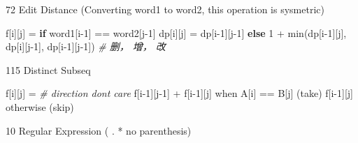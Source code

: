 \documentclass[
]{article}
\newenvironment{Shaded}{}{}
\newcommand{\BuiltInTok}[1]{#1}
\newcommand{\CommentTok}[1]{\textcolor[rgb]{0.38,0.63,0.69}{\textit{#1}}}
\newcommand{\ControlFlowTok}[1]{\textcolor[rgb]{0.00,0.44,0.13}{\textbf{#1}}}
\newcommand{\DecValTok}[1]{\textcolor[rgb]{0.25,0.63,0.44}{#1}}
\newcommand{\NormalTok}[1]{#1}
\newcommand{\OperatorTok}[1]{\textcolor[rgb]{0.40,0.40,0.40}{#1}}
\begin{document}
72 Edit Distance (Converting word1 to word2, this operation is
sysmetric)

\begin{Shaded}
\begin{Highlighting}[]
\NormalTok{f[i][j] }\OperatorTok{=} \ControlFlowTok{if}\NormalTok{ word1[i}\OperatorTok{{-}}\DecValTok{1}\NormalTok{] }\OperatorTok{==}\NormalTok{ word2[j}\OperatorTok{{-}}\DecValTok{1}\NormalTok{]	dp[i][j] }\OperatorTok{=}\NormalTok{ dp[i}\OperatorTok{{-}}\DecValTok{1}\NormalTok{][j}\OperatorTok{{-}}\DecValTok{1}\NormalTok{]}
					\ControlFlowTok{else} 												\DecValTok{1} \OperatorTok{+} \BuiltInTok{min}\NormalTok{(dp[i}\OperatorTok{{-}}\DecValTok{1}\NormalTok{][j], dp[i][j}\OperatorTok{{-}}\DecValTok{1}\NormalTok{], dp[i}\OperatorTok{{-}}\DecValTok{1}\NormalTok{][j}\OperatorTok{{-}}\DecValTok{1}\NormalTok{])  }\CommentTok{\# 删， 增， 改}
\end{Highlighting}
\end{Shaded}

115 Distinct Subseq

\begin{Shaded}
\begin{Highlighting}[]
\NormalTok{f[i][j] }\OperatorTok{=} \CommentTok{\# direction don\textquotesingle{}t care}
\NormalTok{					f[i}\OperatorTok{{-}}\DecValTok{1}\NormalTok{][j}\OperatorTok{{-}}\DecValTok{1}\NormalTok{] }\OperatorTok{+}\NormalTok{ f[i}\OperatorTok{{-}}\DecValTok{1}\NormalTok{][j] when A[i] }\OperatorTok{==}\NormalTok{ B[j] (take)}
\NormalTok{  				f[i}\OperatorTok{{-}}\DecValTok{1}\NormalTok{][j] otherwise (skip) }
\end{Highlighting}
\end{Shaded}

10 Regular Expression ( . * no parenthesis)
\end{document}
